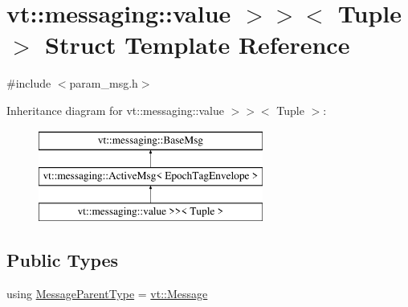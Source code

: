 \hypertarget{structvt_1_1messaging_1_1_param_msg_3_01_tuple_00_01std_1_1enable__if__t_3_01not_01is__byte__copae27aaaf2bf1aaed1864cee3aebbc774}{}\section{vt\+:\+:messaging\+:\+:value $>$$>$$<$ Tuple $>$ Struct Template Reference}
\label{structvt_1_1messaging_1_1_param_msg_3_01_tuple_00_01std_1_1enable__if__t_3_01not_01is__byte__copae27aaaf2bf1aaed1864cee3aebbc774}


{\ttfamily \#include $<$param\+\_\+msg.\+h$>$}

Inheritance diagram for vt\+:\+:messaging\+:\+:value $>$$>$$<$ Tuple $>$\+:\begin{figure}[H]
\begin{center}
\leavevmode
\includegraphics[height=3.000000cm]{structvt_1_1messaging_1_1_param_msg_3_01_tuple_00_01std_1_1enable__if__t_3_01not_01is__byte__copae27aaaf2bf1aaed1864cee3aebbc774}
\end{center}
\end{figure}
\subsection*{Public Types}
\begin{DoxyCompactItemize}
\item 
using \hyperlink{structvt_1_1messaging_1_1_param_msg_3_01_tuple_00_01std_1_1enable__if__t_3_01not_01is__byte__copae27aaaf2bf1aaed1864cee3aebbc774_a1df6cf9b9df170d14173533ead85534d}{Message\+Parent\+Type} = \hyperlink{namespacevt_a3a3ddfef40b4c90915fa43cdd5f129ea}{vt\+::\+Message}
\end{DoxyCompactItemize}

